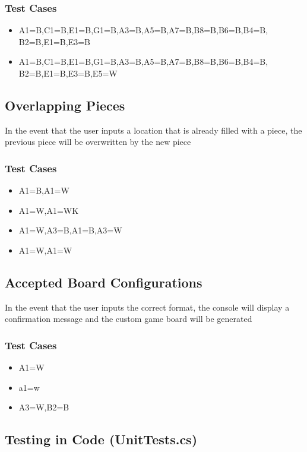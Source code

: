 \documentclass{article}
\begin{document}
\subsubsection*{Test Cases}
\begin{itemize}
\item A1=B,C1=B,E1=B,G1=B,A3=B,A5=B,A7=B,B8=B,B6=B,B4=B, \\
B2=B,E1=B,E3=B
\item A1=B,C1=B,E1=B,G1=B,A3=B,A5=B,A7=B,B8=B,B6=B,B4=B, \\
B2=B,E1=B,E3=B,E5=W
\end{itemize}

\subsection{Overlapping Pieces}
In the event that the user inputs a location that is already filled with a piece, the previous piece will be overwritten by the new piece
\subsubsection*{Test Cases}
\begin{itemize}
\item A1=B,A1=W
\item A1=W,A1=WK
\item A1=W,A3=B,A1=B,A3=W
\item A1=W,A1=W
\end{itemize}

\subsection{Accepted Board Configurations}
In the event that the user inputs the correct format, the console will display a confirmation message and the custom game board will be generated 

\subsubsection*{Test Cases}
\begin{itemize}
\item A1=W
\item a1=w
\item A3=W,B2=B
\end{itemize}

\subsection{Testing in Code (UnitTests.cs)} \label{a2:ss:boardtests}
\end{document}
